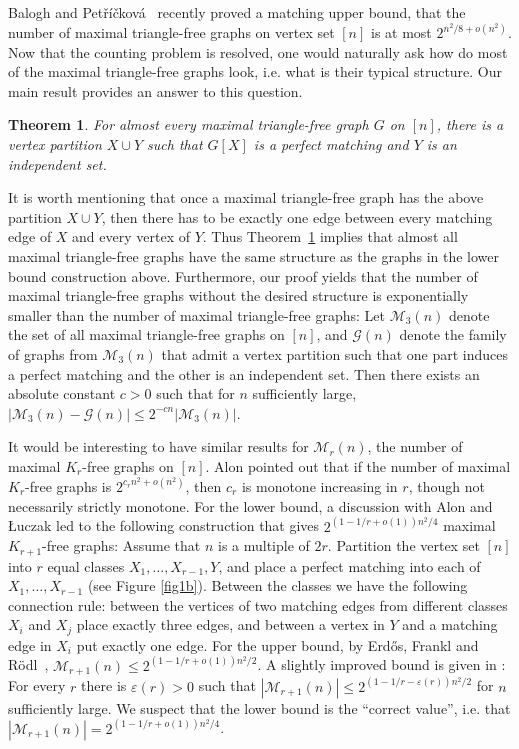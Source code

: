 \documentclass[12pt]{article}
\newtheorem{theorem}{Theorem}[section]
\theoremstyle{definition}
\theoremstyle{definition}
\theoremstyle{definition}
\theoremstyle{definition}
\theoremstyle{definition}
\theoremstyle{definition}
\theoremstyle{definition}
\newcommand{\ep}{\varepsilon}
\newcommand{\cG}{\mathcal{G}}
\newcommand{\3}{\bf{3}}
\newcommand{\MTF}{\mathcal{M}_3}
\newcommand{\cM}{\mathcal{M}}
\begin{document}
Balogh and Pet\v{r}\'{i}\v{c}kov\'{a}~\cite{BP} recently proved a matching upper bound, that the number of maximal triangle-free graphs on vertex set $[n]$ is at most $2^{n^2/8+o(n^2)}$. Now that the counting problem is resolved, one would naturally ask how do most of the maximal triangle-free graphs look, i.e. what is their typical structure. Our main result provides an answer to this question.  
\begin{theorem}\label{thm_main}
For almost every maximal triangle-free graph $G$ on $[n]$, there is a vertex partition $X\cup Y$ such that $G[X]$ is a perfect matching and $Y$ is an independent set.
\end{theorem}
It is worth mentioning that once a maximal triangle-free graph has the above partition $X\cup Y$, then there has to be exactly one edge between every matching edge of $X$ and every vertex of $Y$. Thus Theorem~\ref{thm_main} implies that almost all maximal triangle-free graphs have the same structure as the graphs in the lower bound construction above. Furthermore, our proof yields that the number of maximal triangle-free graphs without the desired structure is exponentially smaller than the number of maximal triangle-free graphs: Let $\MTF(n)$ denote the set of all maximal triangle-free graphs on $[n]$, and $\cG(n)$ denote the family of graphs from $\MTF(n)$ that admit a vertex partition such that one part induces a perfect matching and the other is an independent set. Then there exists an absolute constant $c>0$ such that for $n$ sufficiently large, $|\MTF(n)-\cG(n)|\leq 2^{-cn}|\MTF(n)|$.

\medskip

It would be interesting to have similar results for $\cM_r(n)$, the number of maximal $K_r$-free graphs on $[n]$. Alon pointed out that if the number of maximal $K_r$-free graphs is $2^{c_r n^2 +o(n^2)}$, then $c_r$ is monotone increasing in $r$, though not necessarily strictly monotone. For the lower bound, a discussion with Alon and \L uczak led to the following construction that gives $2^{(1-1/r+o(1))n^2/4}$ maximal $K_{r+1}$-free graphs: Assume that $n$ is a multiple of $2r$. Partition the vertex set $[n]$ into $r$ equal classes $X_1,\dots, X_{r-1},Y$, and place a perfect matching into each of $X_1,\dots, X_{r-1}$ (see Figure \ref{fig1b}). Between the classes we have the following connection rule:
between the vertices of two matching edges from different classes $X_i$ and $X_j$ place exactly three edges, and between a vertex in $Y$ and a matching edge in $X_i$ put exactly one edge. For the upper bound, by Erd\H{o}s, Frankl and R\"{o}dl~\cite{EFR}, $\cM_{r+1}(n)\leq 2^{(1-1/r+o(1))n^2/2}$. A slightly improved bound is given in \cite{BP}: For every $r$ there is $\ep(r)>0$ such that $|\cM_{r+1}(n)|\leq 2^{(1-1/r-\ep(r))n^2/2}$ for $n$ sufficiently large. We suspect that the lower bound is the ``correct value'', i.e. that $|\cM_{r+1}(n)|= 2^{(1-1/r+o(1))n^2/4}$.
\end{document}

